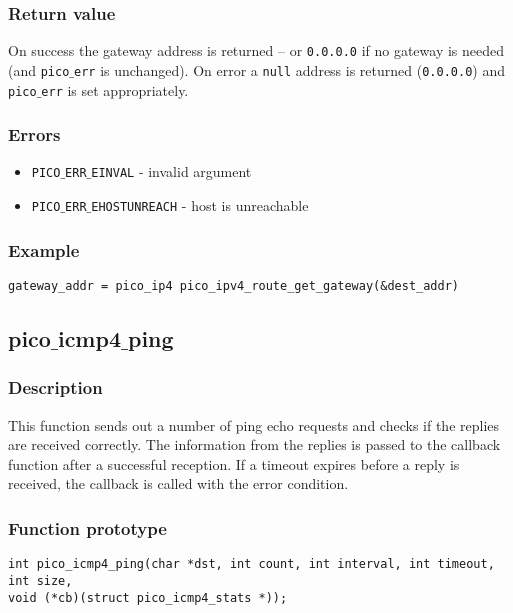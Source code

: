 \subsubsection*{Return value}
On success the gateway address is returned -- or \texttt{0.0.0.0} if no gateway is needed (and \texttt{pico$\_$err} is unchanged).
On error a \texttt{null} address is returned (\texttt{0.0.0.0}) and \texttt{pico$\_$err} is set appropriately.

\subsubsection*{Errors}
\begin{itemize}[noitemsep]
\item \texttt{PICO$\_$ERR$\_$EINVAL} - invalid argument
\item \texttt{PICO$\_$ERR$\_$EHOSTUNREACH} - host is unreachable
\end{itemize}

\subsubsection*{Example}
\begin{verbatim}
gateway_addr = pico_ip4 pico_ipv4_route_get_gateway(&dest_addr)
\end{verbatim}


\subsection{pico$\_$icmp4$\_$ping}

\subsubsection*{Description}
This function sends out a number of ping echo requests and checks if the replies are received correctly.
The information from the replies is passed to the callback function after a successful reception.
If a timeout expires before a reply is received, the callback is called with the error condition.

\subsubsection*{Function prototype}
\begin{verbatim}
int pico_icmp4_ping(char *dst, int count, int interval, int timeout, int size,
void (*cb)(struct pico_icmp4_stats *));
\end{verbatim}

